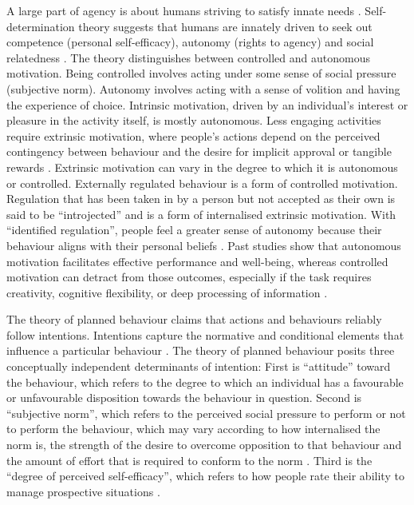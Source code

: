 A large part of agency is about humans striving to satisfy innate needs \citep{deci2001need}. Self-determination theory suggests that humans are innately driven to seek out competence (personal self-efficacy), autonomy (rights to agency) and social relatedness \citep{ryan2000self}. The theory distinguishes between controlled and autonomous motivation. Being controlled involves acting under some sense of social pressure (subjective norm). Autonomy involves acting with a sense of volition and having the experience of choice. Intrinsic motivation, driven by an individual's interest or pleasure in the activity itself, is mostly autonomous. Less engaging activities require extrinsic motivation, where people's actions depend on the perceived contingency between behaviour and the desire for implicit approval or tangible rewards \citep{gagne2005self}. Extrinsic motivation can vary in the degree to which it is autonomous or controlled. Externally regulated behaviour is a form of controlled motivation. Regulation that has been taken in by a person but not accepted as their own is said to be \enquote{introjected} and is a form of internalised extrinsic motivation. With \enquote{identified regulation}, people feel a greater sense of autonomy because their behaviour aligns with their personal beliefs \citep{gagne2005self}. Past studies show that autonomous motivation facilitates effective performance and well-being, whereas controlled motivation can detract from those outcomes, especially if the task requires creativity, cognitive flexibility, or deep processing of information \citep{gagne2005self}. \medskip

The theory of planned behaviour claims that actions and behaviours reliably follow intentions. Intentions capture the normative and conditional elements that influence a particular behaviour \citep{ajzen1985intentions}. The theory of planned behaviour posits three conceptually independent determinants of intention: First is \enquote{attitude} toward the behaviour, which refers to the degree to which an individual has a favourable or unfavourable disposition towards the behaviour in question. Second is \enquote{subjective norm}, which refers to the perceived social pressure to perform or not to perform the behaviour, which may vary according to how internalised the norm is, the strength of the desire to overcome opposition to that behaviour and the amount of effort that is required to conform to the norm \citep{loyal2001agency}. Third is the \enquote{degree of perceived self-efficacy}, which refers to how people rate their ability to manage prospective situations \citep{white1959motivation, bandura1982self,ajzen1991theory}. \medskip


